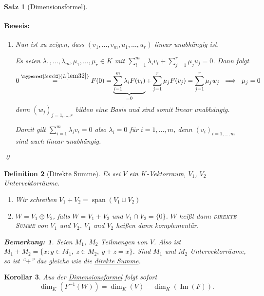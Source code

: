 \documentclass{report}
\newcommand{\IN}[1]{\index{#1|BH}}
\newcommand{\lb}{\lambda}
\DeclareMathOperator{\Span}{span}
\DeclareMathOperator{\Ima}{Im}
\theoremstyle{customrem}
\newtheorem*{bemerkung}{Bemerkung\textnormal:}
\theoremstyle{customdef}
\newtheorem{definition}{Definition}[chapter]
\newtheorem{korrolar}[definition]{Korollar}
\newtheorem{satz}[definition]{Satz}
\renewenvironment{proof}{\paragraph{Beweis: }}{\qed}
\newcommand{\defemph}[1]{\textsc{#1}}
\begin{document}
\begin{satz}[Dimensionsformel]
\begin{proof}
\begin{enumerate}
				Somit erzeugt \((v_1, \ldots, v_m, u_1, \ldots, u_r)\) den Vektorraum \(V\).
				
				\item Nun ist zu zeigen, dass \((v_1, \ldots, v_m, u_1, \ldots, u_r)\) linear unabhängig ist.
				
				Es seien \(\lb_1,\ldots, \lb_m, \mu_1, \ldots, \mu_r\in K\) mit \(\sum_{i=1}^{m}\lb_i v_i + \sum_{j=1}^{r}\mu_j u_j=0\). Dann folgt \[0\stackrel{\hyperref[lem32]{L\ref*{lem32}}}{=} F(0) = \underbrace{\sum_{i=1}^{m}\lb_i F(v_i)}_{=0} + \sum_{j=1}^{r}\mu_jF(v_j) = \sum_{j=1}^{r}\mu_jw_j\ \implies \ \mu_j = 0\] denn \((w_j)_{j=1,\ldots, r}\) bilden eine Basis und sind somit linear unabhängig.
				
				Damit gilt \(\sum_{i=1}^{m}\lb_iv_i=0\) also \(\lb_i=0\) für \(i=1, \ldots, m\), denn \((v_i)_{i=1, \ldots, m}\) sind auch linear unabhängig.\\
			\end{enumerate}
		\end{proof}
	\end{satz}
	
	\begin{definition}[Direkte Summe]
		\IN{Direkte Summe}
		\label{def38}
		Es sei \(V\) ein \(K\)-Vektorraum, \(V_1\), \(V_2\) Untervektorräume.
		\begin{enumerate}
			\item Wir schreiben \(V_1+V_2=\Span(V_1\cup V_2)\)
			\item \(W=V_1\oplus V_2\), falls \(W=V_1+V_2\) und \(V_1\cap V_2 = \{0\}\). \(W\) heißt dann \defemph{direkte Summe} von \(V_1\) und \(V_2\). \(V_1\) und \(V_2\) heißen dann komplementär.
		\end{enumerate}
		\begin{bemerkung}
			Seien \(M_1\), \(M_2\) Teilmengen von \(V\). Also ist \(M_1 + M_2 = \{x:y\in M_1,\ z\in M_2,\ y+z=x\}\). Sind \(M_1\) und \(M_2\) Untervektorräume, so ist "`\(+\)"' das gleiche wie die \hyperref[def38]{direkte Summe}.
		\end{bemerkung}
	\end{definition}
	\vspace{.1cm}
	\begin{korrolar}		
		Aus der \hyperref[satz37]{Dimensionsformel} folgt sofort \[\dim_K\left(F^{-1}(W)\right) = \dim_K(V)-\dim_K(\Ima(F)).\]
	\end{korrolar}
	
\end{document}
